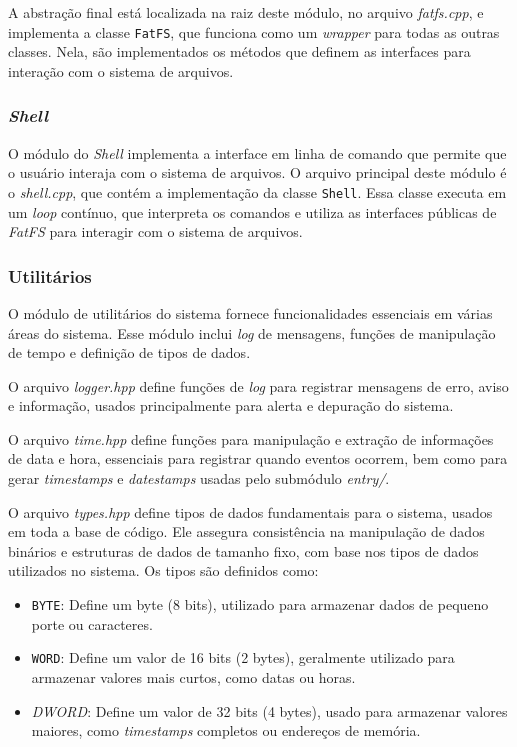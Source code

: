 \documentclass[
    12pt,				%
    oneside,   	        %
    a4paper,			%
    english,			%
    french,				%
    spanish,			%
    brazil,				%
    ]{pacotes/abntex2}
\begin{document}
A abstração final está localizada na raiz deste módulo, no arquivo \textit{fatfs.cpp}, e implementa a classe \texttt{FatFS}, que funciona como um \textit{wrapper} para todas as outras classes. Nela, são implementados os métodos que definem as interfaces para interação com o sistema de arquivos.

\subsubsection{\textit{Shell}}
\label{subsubsec:shell}

O módulo do \textit{Shell} implementa a interface em linha de comando que permite que o usuário interaja com o sistema de arquivos. O arquivo principal deste módulo é o \textit{shell.cpp}, que contém a implementação da classe \texttt{Shell}. Essa classe executa em um \textit{loop} contínuo, que interpreta os comandos e utiliza as interfaces públicas de \textit{FatFS} para interagir com o sistema de arquivos.

\subsubsection{Utilitários}
\label{subsubsec:utils}

O módulo de utilitários do sistema fornece funcionalidades essenciais em várias áreas do sistema. Esse módulo inclui \textit{log} de mensagens, funções de manipulação de tempo e definição de tipos de dados.

O arquivo \textit{logger.hpp} define funções de \textit{log} para registrar mensagens de erro, aviso e informação, usados principalmente para alerta e depuração do sistema.

O arquivo \textit{time.hpp} define funções para manipulação e extração de informações de data e hora, essenciais para registrar quando eventos ocorrem, bem como para gerar \textit{timestamps} e \textit{datestamps} usadas pelo submódulo \textit{entry/}.

O arquivo \textit{types.hpp} define tipos de dados fundamentais para o sistema, usados em toda a base de código. Ele assegura consistência na manipulação de dados binários e estruturas de dados de tamanho fixo, com base nos tipos de dados utilizados no sistema. Os tipos são definidos como:

\begin{itemize}
    \item \texttt{BYTE}: Define um byte (8 bits), utilizado para armazenar dados de pequeno porte ou caracteres.
    
    \item \texttt{WORD}: Define um valor de 16 bits (2 bytes), geralmente utilizado para armazenar valores mais curtos, como datas ou horas.
    
    \item \textit{DWORD}: Define um valor de 32 bits (4 bytes), usado para armazenar valores maiores, como \textit{timestamps} completos ou endereços de memória.
\end{itemize}
\end{document}
